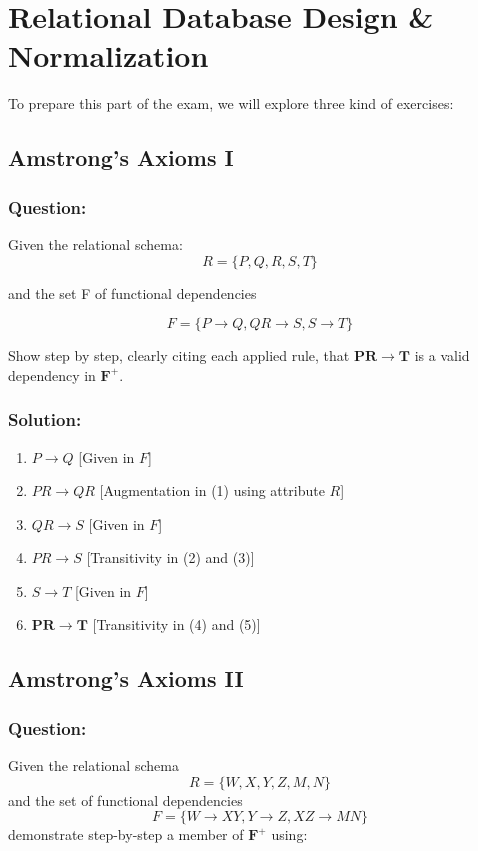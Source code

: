 \documentclass{article}
\begin{document}
\section{Relational Database Design \& Normalization}
To prepare this part of the exam, we will explore three kind of exercises:

\subsection{Amstrong's Axioms I}

\subsubsection*{Question:}
Given the relational schema:
    $$R = \{P, Q, R, S, T\}$$

and the set F of functional dependencies

    $$F = \{ P \rightarrow Q, QR \rightarrow S, S \rightarrow T \}$$

Show step by step, clearly citing each applied rule, that $\mathbf{PR \rightarrow T}$ is a valid dependency in $\mathbf{F^+}$.

\subsubsection*{Solution:}
    \begin{enumerate}
        \item $P \rightarrow Q$ \hfill [Given in $F$]
        \item $PR \rightarrow QR$ \hfill [Augmentation in (1) using attribute $R$]
        \item $QR \rightarrow S$ \hfill [Given in $F$]
        \item $PR \rightarrow S$ \hfill [Transitivity in (2) and (3)]
        \item $S \rightarrow T$ \hfill [Given in $F$]
        \item $\mathbf{PR \rightarrow T}$ \hfill [Transitivity in (4) and (5)]
    \end{enumerate}

\subsection{Amstrong's Axioms II}

\subsubsection*{Question:}
Given the relational schema
    $$R = \{W, X, Y, Z, M, N\}$$
    and the set of functional dependencies
    $$F = \{ W \rightarrow XY, Y \rightarrow Z, XZ \rightarrow MN \}$$
    demonstrate step-by-step a member of $\mathbf{F^+}$ using:
\end{document}
